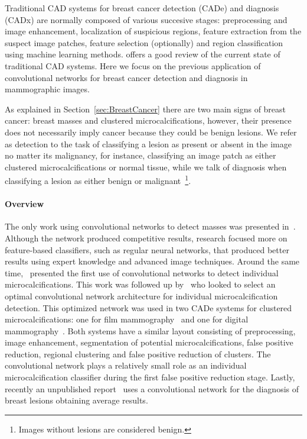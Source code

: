 Traditional CAD systems for breast cancer detection (CADe) and diagnosis (CADx) are normally composed of various succesive stages: preprocessing and image enhancement, localization of suspicious regions, feature extraction from the suspect image patches, feature selection (optionally) and region classification using machine learning methods. \cite{Tang2009} offers a good review of the current state of traditional CAD systems. Here we focus on the previous application of convolutional networks for breast cancer detection and diagnosis in mammographic images.

As explained in Section~\ref{sec:BreastCancer} there are two main signs of breast cancer: breast masses and clustered microcalcifications, however, their presence does not necessarily imply cancer because they could be benign lesions. We refer as detection to the task of classifying a lesion as present or absent in the image no matter its malignancy, for instance, classifying an image patch as either clustered microcalcifications or normal tissue, while we talk of diagnosis when classifying a lesion as either benign or malignant~\footnote{Images without lesions are considered benign.}.

\paragraph{Overview}
The only work using convolutional networks to detect masses was presented in~\cite{Sahiner1996}. Although the network produced competitive results, research focused more on feature-based classifiers, such as regular neural networks, that produced better results using expert knowledge and advanced image techniques. Around the same time,~\cite{Lo1995} presented the first use of convolutional networks to detect individual microcalcifications. This work was followed up by~\cite{Gurcan2002} who looked to select an optimal convolutional network architecture for individual microcalcification detection. This optimized network was used in two CADe systems for clustered microcalcifications: one for film mammography~\cite{Gurcan2002} and one for digital mammography~\cite{Ge2006}. Both systems have a similar layout consisting of preprocessing, image enhancement, segmentation of potential microcalcifications, false positive reduction, regional clustering and false positive reduction of clusters. The convolutional network plays a relatively small role as an individual microcalcification classifier during the first false positive reduction stage. Lastly, recently an unpublished report~\cite{Agarwal2015} uses a convolutional network for the diagnosis of breast lesions obtaining average results.

